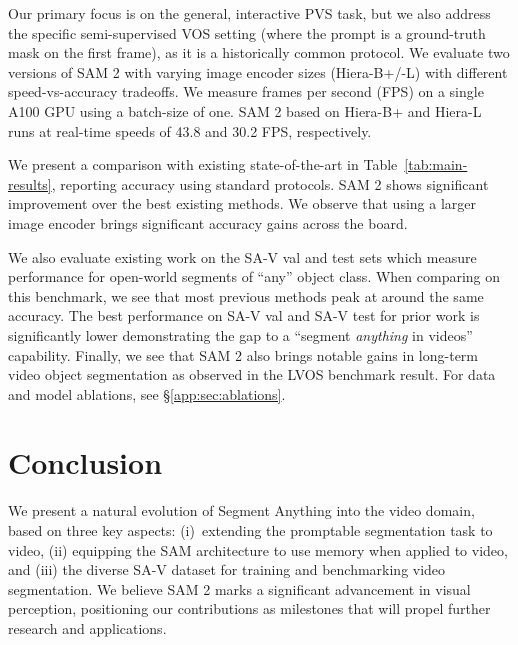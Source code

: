\documentclass[]{fairmeta}
\newcommand{\tabref}[1]{Table~\ref{#1}}
\begin{document}
Our primary focus is on the general, interactive PVS task, but we also address the specific semi-supervised VOS setting (where the prompt is a ground-truth mask on the first frame), as it is a historically common protocol. 
We evaluate two versions of SAM 2 with varying image encoder sizes (Hiera-B+/-L) with different speed-vs-accuracy tradeoffs. We measure frames per second (FPS) on a single A100 GPU using a batch-size of one. SAM 2 based on Hiera-B+ and Hiera-L runs at real-time speeds of 43.8 and 30.2 FPS, respectively.

We present a comparison with existing state-of-the-art in \tabref{tab:main-results}, reporting accuracy using standard protocols.
SAM 2 shows significant improvement over the best existing methods. We observe that using a larger image encoder brings significant accuracy gains across the board.

We also evaluate existing work on the SA-V val and test sets which measure performance for open-world segments of ``any'' object class. When comparing on this benchmark, we see that most previous methods peak at around the same accuracy. The best performance on SA-V val and SA-V test for prior work is significantly lower demonstrating the gap to a ``segment \textit{anything} in videos'' capability. Finally, we see that SAM 2 also brings notable gains in long-term video object segmentation as observed in the LVOS benchmark result. For data and model ablations, see \S\ref{app:sec:ablations}.

\section{Conclusion}
\label{sec:disc}

We present a natural evolution of Segment Anything into the video domain, based on three key aspects: (i)~extending the promptable segmentation task to video, (ii) equipping the SAM architecture to use memory when applied to video, and (iii) the diverse SA-V dataset for training and benchmarking video segmentation.
We believe SAM 2 marks a significant advancement in visual perception, positioning our contributions as milestones that will propel further research and applications. %
\end{document}
